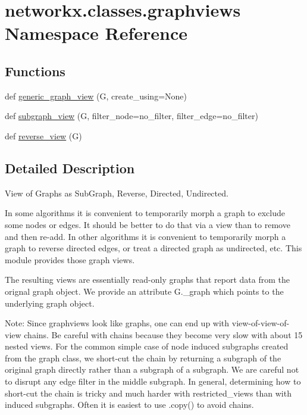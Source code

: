 \hypertarget{namespacenetworkx_1_1classes_1_1graphviews}{}\section{networkx.\+classes.\+graphviews Namespace Reference}
\label{namespacenetworkx_1_1classes_1_1graphviews}
\subsection*{Functions}
\begin{DoxyCompactItemize}
\item 
def \hyperlink{namespacenetworkx_1_1classes_1_1graphviews_a874b4e1287fcca8fa8eeda3d1926c10c}{generic\+\_\+graph\+\_\+view} (G, create\+\_\+using=None)
\item 
def \hyperlink{namespacenetworkx_1_1classes_1_1graphviews_a33dcd3d967dd7ca14ad2bb823e4e831b}{subgraph\+\_\+view} (G, filter\+\_\+node=no\+\_\+filter, filter\+\_\+edge=no\+\_\+filter)
\item 
def \hyperlink{namespacenetworkx_1_1classes_1_1graphviews_a88278e8cd74c849cf5208ea8b14ad499}{reverse\+\_\+view} (G)
\end{DoxyCompactItemize}


\subsection{Detailed Description}
\begin{DoxyVerb}View of Graphs as SubGraph, Reverse, Directed, Undirected.

In some algorithms it is convenient to temporarily morph
a graph to exclude some nodes or edges. It should be better
to do that via a view than to remove and then re-add.
In other algorithms it is convenient to temporarily morph
a graph to reverse directed edges, or treat a directed graph
as undirected, etc. This module provides those graph views.

The resulting views are essentially read-only graphs that
report data from the orignal graph object. We provide an
attribute G._graph which points to the underlying graph object.

Note: Since graphviews look like graphs, one can end up with
view-of-view-of-view chains. Be careful with chains because
they become very slow with about 15 nested views.
For the common simple case of node induced subgraphs created
from the graph class, we short-cut the chain by returning a
subgraph of the original graph directly rather than a subgraph
of a subgraph. We are careful not to disrupt any edge filter in
the middle subgraph. In general, determining how to short-cut
the chain is tricky and much harder with restricted_views than
with induced subgraphs.
Often it is easiest to use .copy() to avoid chains.
\end{DoxyVerb}
 

